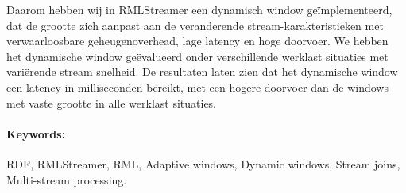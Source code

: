 Daarom hebben wij in RMLStreamer een dynamisch window geïmplementeerd, 
dat de grootte zich aanpast aan de veranderende stream-karakteristieken met 
verwaarloosbare geheugenoverhead, lage latency en hoge doorvoer.
We hebben het dynamische window geëvalueerd onder verschillende werklast situaties 
met variërende stream snelheid.
De resultaten laten zien dat het dynamische window een latency in milliseconden bereikt, 
met een hogere doorvoer dan de windows met vaste grootte in alle werklast situaties.

\paragraph{Keywords:}

RDF, RMLStreamer, RML, Adaptive windows, Dynamic windows,
Stream joins, Multi-stream processing.

